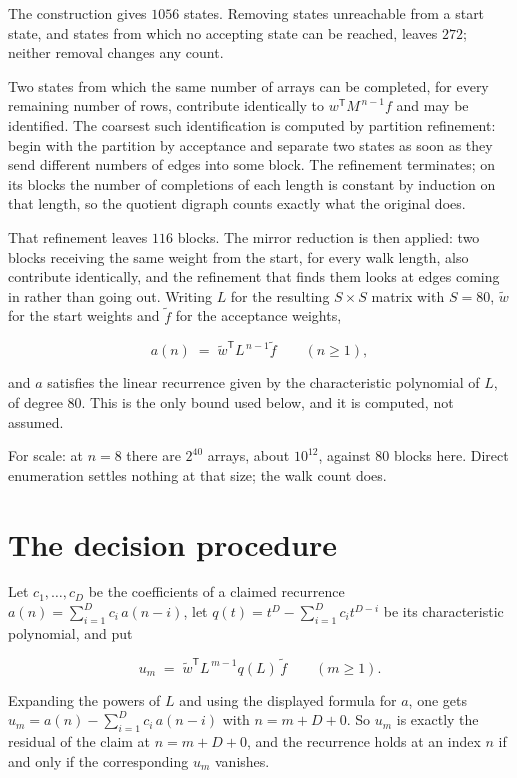 \documentclass[11pt]{article}
\theoremstyle{definition}
\begin{document}
The construction gives $1056$ states. Removing states unreachable from a start state, and states from which no accepting state can be reached, leaves $272$; neither removal changes any count.

Two states from which the same number of arrays can be completed, for every remaining number of rows, contribute identically to $w^{\mathsf T}M^{\,n-1}f$ and may be identified. The coarsest such identification is computed by partition refinement: begin with the partition by acceptance and separate two states as soon as they send different numbers of edges into some block. The refinement terminates; on its blocks the number of completions of each length is constant by induction on that length, so the quotient digraph counts exactly what the original does.

That refinement leaves $116$ blocks. The mirror reduction is then applied: two blocks receiving the same weight from the start, for every walk length, also contribute identically, and the refinement that finds them looks at edges coming in rather than going out. Writing $L$ for the resulting $S \times S$ matrix with $S = 80$, $\tilde w$ for the start weights and $\tilde f$ for the acceptance weights,

\[a(n) \;=\; \tilde w^{\mathsf T} L^{\,n-1} \tilde f \qquad (n \ge 1),\]

and $a$ satisfies the linear recurrence given by the characteristic polynomial of $L$, of degree $80$. This is the only bound used below, and it is computed, not assumed.

For scale: at $n = 8$ there are $2^{40}$ arrays, about $10^{12}$, against $80$ blocks here. Direct enumeration settles nothing at that size; the walk count does.

\section{The decision procedure}

Let $c_1,\dots,c_D$ be the coefficients of a claimed recurrence $a(n) = \sum_{i=1}^{D} c_i\,a(n-i)$, let $q(t) = t^{D} - \sum_{i=1}^{D} c_i t^{D-i}$ be its characteristic polynomial, and put

\[u_m \;=\; \tilde w^{\mathsf T} L^{\,m-1} q(L)\,\tilde f \qquad (m \ge 1).\]

Expanding the powers of $L$ and using the displayed formula for $a$, one gets $u_m = a(n) - \sum_{i=1}^{D} c_i\,a(n-i)$ with $n = m + D + 0$. So $u_m$ is exactly the residual of the claim at $n = m + D + 0$, and the recurrence holds at an index $n$ if and only if the corresponding $u_m$ vanishes.
\end{document}
